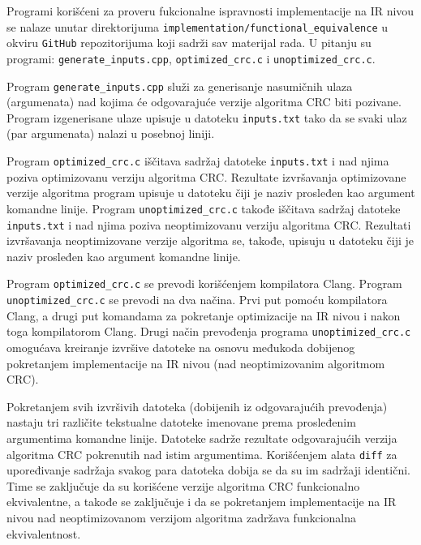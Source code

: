 \documentclass[12pt,oneside]{memoir}
\begin{document}

Programi korišćeni za proveru fukcionalne ispravnosti implementacije na IR nivou se nalaze unutar direktorijuma \texttt{implementation/functional\_equivalence} u okviru \texttt{GitHub} repozitorijuma koji sadrži sav materijal rada. U pitanju su programi:
\texttt{generate\_inputs.cpp}, \texttt{optimized\_crc.c} i \texttt{unoptimized\_crc.c}. 

Program \texttt{generate\_inputs.cpp} služi za generisanje nasumičnih ulaza (argumenata) nad kojima će odgovarajuće verzije algoritma CRC biti pozivane. Program izgenerisane ulaze upisuje u datoteku \texttt{inputs.txt} tako da se svaki ulaz (par argumenata) nalazi u posebnoj liniji. 

Program \texttt{optimized\_crc.c} iščitava sadržaj datoteke \texttt{inputs.txt} i nad njima poziva optimizovanu verziju algoritma CRC. Rezultate izvršavanja optimizovane verzije algoritma program upisuje u datoteku čiji je naziv prosleđen kao argument komandne linije. Program \texttt{unoptimized\_crc.c} takođe iščitava sadržaj datoteke \texttt{inputs.txt} i nad njima poziva neoptimizovanu verziju algoritma CRC. Rezultati izvršavanja neoptimizovane verzije algoritma se, takođe, upisuju u datoteku čiji je naziv prosleđen kao argument komandne linije. 

Program \texttt{optimized\_crc.c} se prevodi korišćenjem kompilatora Clang. Program \texttt{unoptimized\_crc.c} se prevodi na dva načina. Prvi put pomoću kompilatora Clang, a drugi put komandama za pokretanje optimizacije na IR nivou i nakon toga kompilatorom Clang. Drugi način prevođenja programa \texttt{unoptimized\_crc.c} omogućava kreiranje izvršive datoteke na osnovu međukoda dobijenog pokretanjem implementacije na IR nivou (nad neoptimizovanim algoritmom CRC).

Pokretanjem svih izvršivih datoteka (dobijenih iz odgovarajućih prevođenja) nastaju tri različite tekstualne datoteke imenovane prema prosleđenim argumentima komandne linije. Datoteke sadrže rezultate odgovarajućih verzija algoritma CRC pokrenutih nad istim argumentima. Korišćenjem alata \texttt{diff} za upoređivanje sadržaja svakog para datoteka dobija se da su im sadržaji identični. Time se zaključuje da su korišćene verzije algoritma CRC funkcionalno ekvivalentne, a takođe se zaključuje i da se pokretanjem implementacije na IR nivou nad neoptimizovanom verzijom algoritma zadržava funkcionalna ekvivalentnost.
\end{document}
